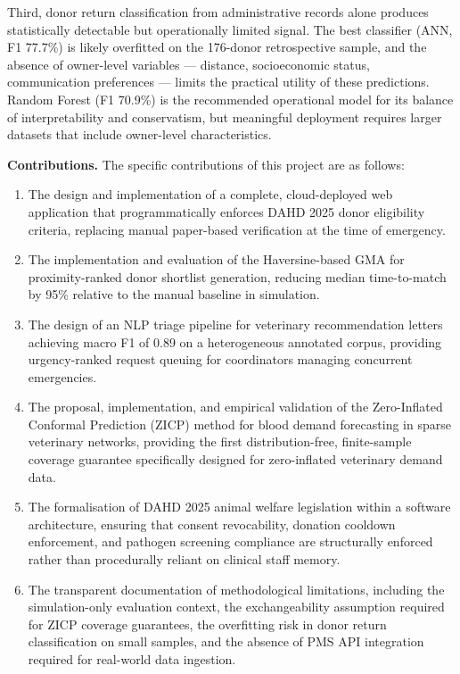 \documentclass[12pt,a4paper]{article}
\begin{document}
\noindent Third, donor return classification from administrative records alone produces statistically detectable but operationally limited signal. The best classifier (ANN, F1 77.7\%) is likely overfitted on the 176-donor retrospective sample, and the absence of owner-level variables — distance, socioeconomic status, communication preferences — limits the practical utility of these predictions. Random Forest (F1 70.9\%) is the recommended operational model for its balance of interpretability and conservatism, but meaningful deployment requires larger datasets that include owner-level characteristics.

\vspace{1.5em}
\noindent\textbf{Contributions.} The specific contributions of this project are as follows:

\begin{enumerate}[leftmargin=1.8em, itemsep=0.5em]
    \item The design and implementation of a complete, cloud-deployed web application that programmatically enforces DAHD 2025 donor eligibility criteria, replacing manual paper-based verification at the time of emergency.
    \item The implementation and evaluation of the Haversine-based GMA for proximity-ranked donor shortlist generation, reducing median time-to-match by 95\% relative to the manual baseline in simulation.
    \item The design of an NLP triage pipeline for veterinary recommendation letters achieving macro F1 of 0.89 on a heterogeneous annotated corpus, providing urgency-ranked request queuing for coordinators managing concurrent emergencies.
    \item The proposal, implementation, and empirical validation of the Zero-Inflated Conformal Prediction (ZICP) method for blood demand forecasting in sparse veterinary networks, providing the first distribution-free, finite-sample coverage guarantee specifically designed for zero-inflated veterinary demand data.
    \item The formalisation of DAHD 2025 animal welfare legislation within a software architecture, ensuring that consent revocability, donation cooldown enforcement, and pathogen screening compliance are structurally enforced rather than procedurally reliant on clinical staff memory.
    \item The transparent documentation of methodological limitations, including the simulation-only evaluation context, the exchangeability assumption required for ZICP coverage guarantees, the overfitting risk in donor return classification on small samples, and the absence of PMS API integration required for real-world data ingestion.
\end{enumerate}
\end{document}
